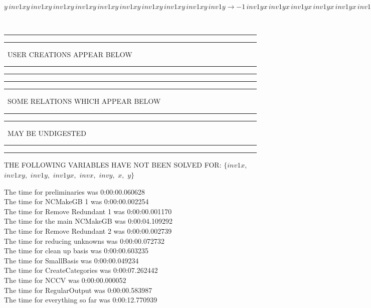 \documentclass[rep10,leqno]{report}
\begin{document}
\begin{minipage}{6in}
$
y\,
 inv1xy\,
 inv1xy\,
 inv1xy\,
 inv1xy\,
 inv1xy\,
 inv1xy\,
 inv1xy\,
 inv1xy\,
 inv1xy\,
 inv1y\rightarrow -1\,
 inv1yx\,
 inv1yx\,
 inv1yx\,
 inv1yx\,
 inv1yx\,
 inv1yx\,
 inv1yx\,
 inv1yx\,
 inv1yx + inv1yx\,
 inv1yx\,
 inv1yx\,
 inv1yx\,
 inv1yx\,
 inv1yx\,
 inv1yx\,
 inv1yx\,
 inv1yx\,
 inv1y
$
\end{minipage}\\
\rule[2pt]{6in}{1pt}\hfil\break
\rule[2.5pt]{1.701in}{1pt}
\ USER CREATIONS APPEAR BELOW\ 
\rule[2.5pt]{1.701in}{1pt}\hfil\break
\rule[2pt]{6in}{1pt}\hfil\break
\rule[2pt]{6in}{4pt}\hfil\break
\rule[2pt]{1.45in}{4pt}
\ SOME RELATIONS WHICH APPEAR BELOW\ 
\rule[2pt]{1.45in}{4pt}\hfil\break
\rule[2pt]{2.18in}{4pt}
\ MAY BE UNDIGESTED\ 
\rule[2pt]{2.18in}{4pt}\hfil\break
\rule[2pt]{6in}{4pt}\hfil\break
THE FOLLOWING VARIABLES HAVE NOT BEEN SOLVED FOR:\hfil\break
$\{inv1x,
$ $
inv1xy,
$ $
inv1y,
$ $
inv1yx,
$ $
invx,
$ $
invy,
$ $
x,
$ $
y\}$
\smallskip\\
\vspace{10pt}

\noindent
The time for preliminaries was 0:00:00.060628\\
The time for NCMakeGB 1 was 0:00:00.002254\\
The time for Remove Redundant 1 was 0:00:00.001170\\
The time for the main NCMakeGB was 0:00:04.109292\\
The time for Remove Redundant 2 was 0:00:00.002739\\
The time for reducing unknowns was 0:00:00.072732\\
The time for clean up basis was 0:00:00.603235\\
The time for SmallBasis was 0:00:00.049234\\
The time for CreateCategories was 0:00:07.262442\\
The time for NCCV was 0:00:00.000052\\
The time for RegularOutput was 0:00:00.583987\\
The time for everything so far was 0:00:12.770939\\
\end{document}
